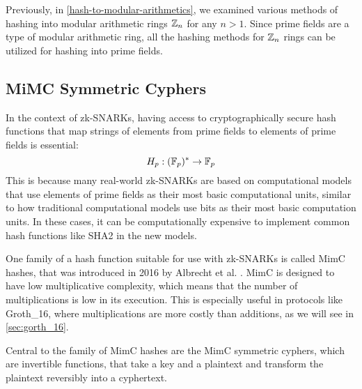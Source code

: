 Previously, in \ref{hash-to-modular-arithmetics}, we examined various methods of hashing into modular arithmetic rings $\mathbb{Z}_n$ for any $n>1$. Since prime fields are a type of modular arithmetic ring, all the hashing methods for $\mathbb{Z}_n$ rings can be utilized for hashing into prime fields.


\subsection{MiMC Symmetric Cyphers} 
In the context of zk-SNARKs, having access to cryptographically secure hash functions that map strings of elements from prime fields to elements of prime fields is essential:
\begin{equation}
H_p : (\mathbb{F}_p)^* \to \mathbb{F}_p
\end{equation}
This is because many real-world zk-SNARKs are based on computational models that use elements of prime fields as their most basic computational units, similar to how traditional computational models use bits as their most basic computation units. In these cases, it can be computationally expensive to implement common hash functions like SHA2 in the new models.

One family of a hash function suitable for use with zk-SNARKs is called MimC hashes, that was introduced in 2016 by Albrecht et al. \cite{albrecht-16}. MimC is designed to have low multiplicative complexity, which means that the number of multiplications is low in its execution. This is especially useful in protocols like Groth\_16, where multiplications are more costly than additions, as we will see in \ref{sec:gorth_16}.

Central to the family of MimC hashes are the MimC symmetric cyphers, which are invertible functions, that take a key and a plaintext and transform the plaintext reversibly into a cyphertext. 


